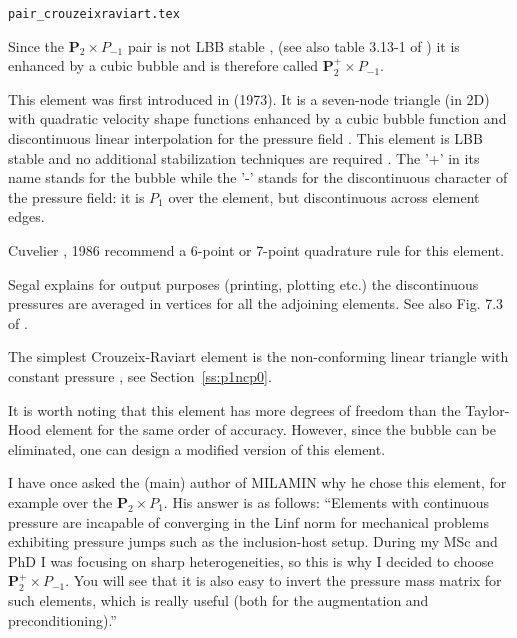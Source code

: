 \begin{flushright} {\tiny {\color{gray} \tt pair\_crouzeixraviart.tex}} \end{flushright}

Since the ${\bm P}_2\times P_{-1}$ pair is not LBB stable \cite[p179]{reddybook2}, 
(see also table 3.13-1 of \textcite{grsa})
it is enhanced by a cubic bubble and is therefore called ${\bm P}_2^+\times P_{-1}$. 

This element was first introduced in \textcite{crra73} (1973).
It is a seven-node triangle (in 2D) with quadratic velocity shape 
functions enhanced by a cubic bubble function and discontinuous linear interpolation for 
the pressure field \cite{cuss86}. 
This element is LBB stable and no additional stabilization techniques are required \cite{elsw}.
The '+' in its name stands for the bubble while the '-' stands for the discontinuous
character of the pressure field: it is $P_1$ over the element, but discontinuous
across element edges.

\begin{remark}
Cuvelier \etal, 1986 \cite{cuss86} recommend a 6-point or 7-point quadrature rule for this element.
\end{remark}

\begin{remark}
Segal \cite{segal} explains 
for output purposes (printing, plotting etc.) the discontinuous pressures are averaged 
in vertices for all the adjoining elements. See also Fig. 7.3 of \cite{cuss86}.
\end{remark}

\begin{remark}
The simplest Crouzeix-Raviart element is the non-conforming linear triangle 
with constant pressure \cite{cuss86}, see Section~\ref{ss:p1ncp0}.
\end{remark}

It is worth noting that this element has more degrees of freedom  than the 
Taylor-Hood element for the same order of accuracy. However, since the 
bubble can be eliminated, one can design a modified version of this element.

\begin{remark}
I have once asked the (main) author of MILAMIN why he chose this element, for 
example over the ${\bm P}_2\times P_1$. His answer is as follows:
{\color{darkgray} ``Elements with continuous pressure  are incapable of converging in the Linf 
norm for mechanical problems exhibiting pressure jumps such as the inclusion-host setup. 
During my MSc and PhD I was focusing on sharp heterogeneities, so this is why I decided 
to choose ${\bm P}_2^+\times P_{-1}$. 
You will see that it is also easy to invert the pressure mass matrix for such elements, 
which is really useful (both for the augmentation and preconditioning).''}
\end{remark}

